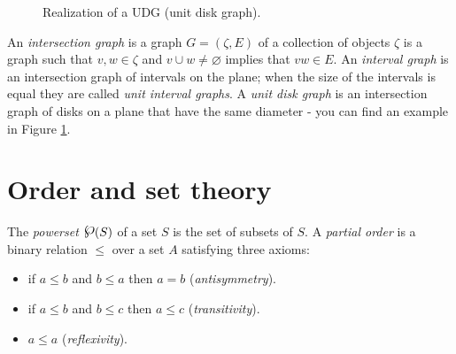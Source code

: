 \begin{figure}
\centering

\begin{scaletikzpicturetowidth}{\textwidth}
\end{scaletikzpicturetowidth}

\caption{Realization of a UDG (unit disk graph).}
\label{fig:udg}
\end{figure}


An \emph{intersection graph} is a graph $G = (\zeta,E)$ of a collection of objects $\zeta$ is a graph such that $v,w \in \zeta$ and $v \cup w \neq \varnothing$ implies that $vw \in E$. An \emph{interval graph} is an intersection graph of intervals on the plane; when the size of the intervals is equal they are called \emph{unit interval graphs}. A \emph{unit disk graph} is an intersection graph of disks on a plane that have the same diameter - you can find an example in Figure \ref{fig:udg}.

\section{Order and set theory}

The \emph{powerset} $\powerset(S)$ of a set $S$ is the set of subsets of $S$. A \emph{partial order} is a binary relation $\leqslant$ over a set $A$ satisfying three axioms:

\begin{itemize}
  \item if $a \leqslant b$ and $b \leqslant a$ then $a = b$ (\emph{antisymmetry}).
  \item if $a \leqslant b$ and $b \leqslant c$ then $a \leqslant c$ (\emph{transitivity}).
  \item $a \leqslant a$ (\emph{reflexivity}).
\end{itemize}

